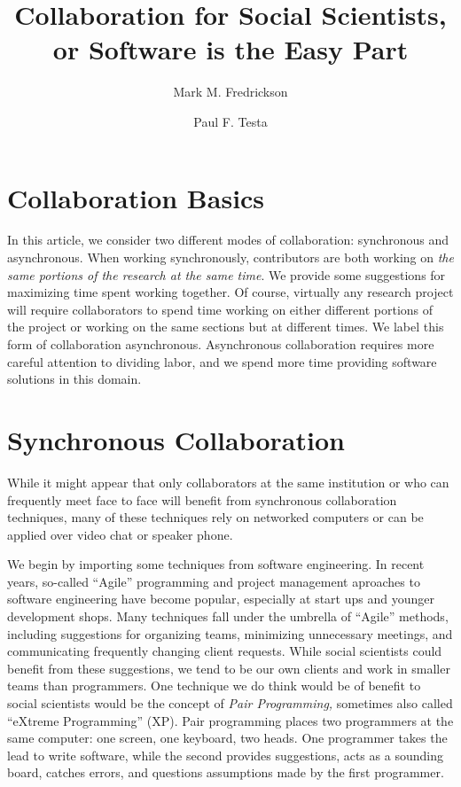 \documentclass[]{article}
\author{Mark M. Fredrickson \and Paul F. Testa} %
\title{Collaboration for Social Scientists, or Software is the Easy Part}
\begin{document}
\maketitle
\section{Collaboration Basics}


In this article, we consider two different modes of collaboration: synchronous
and asynchronous. When working synchronously, contributors are both working on
\emph{the same portions of the research at the same time}. We provide some
suggestions for maximizing time spent working together. Of course, virtually
any research project will require collaborators to spend time working on
either different portions of the project or working on the same sections but
at different times. We label this form of collaboration asynchronous.
Asynchronous collaboration requires more careful attention to dividing labor,
and we spend more time providing software solutions in this domain.

\section{Synchronous Collaboration}

While it might appear that only collaborators at the same institution or who can
frequently meet face to face will benefit from synchronous collaboration
techniques, many of these techniques rely on networked computers or can be
applied over video chat or speaker phone.

We begin by importing some techniques from software engineering. In recent
years, so-called ``Agile'' programming and project management aproaches to
software engineering have become popular, especially at start ups and younger
development shops. Many techniques fall under the umbrella of ``Agile''
methods, including suggestions for organizing teams, minimizing unnecessary
meetings, and communicating frequently changing client requests. While social
scientists could benefit from these suggestions, we tend to be our own clients
and work in smaller teams than programmers. One technique we do think would be
of benefit to social scientists would be the concept of \emph{Pair
Programming,} sometimes also called ``eXtreme Programming'' (XP). Pair
programming places two programmers at the same computer: one screen, one
keyboard, two heads. One programmer takes the lead to write software, while
the second provides suggestions, acts as a sounding board, catches errors, and
questions assumptions made by the first programmer. 
\end{document}
